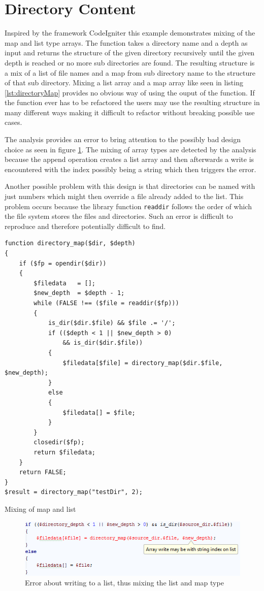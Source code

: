 \section{Directory Content}
\label{sec:directoryContent}
Inspired by the framework CodeIgniter this example demonstrates mixing of the map and list type arrays. The function takes a directory name and a depth as input and returns the structure of the given directory recursively until the given depth is reached or no more sub directories are found. The resulting structure is a mix of a list of file names and a map from sub directory name to the structure of that sub directory. Mixing a list array and a map array like seen in listing \ref{lst:directoryMap} provides no obvious way of using the ouput of the function. If the function ever has to be refactored the users may use the resulting structure in many different ways making it difficult to refactor without breaking possible use cases.

The analysis provides an error to bring attention to the possibly bad design choice as seen in figure \ref{fig:directoryScreenshot}. The mixing of array types are detected by the analysis because the append operation creates a list array and then afterwards a write is encountered with the index possibly being a string which then triggers the error.

Another possible problem with this design is that directories can be named with just numbers which might then override a file already added to the list. This problem occurs because the library function \texttt{readdir} follows the order of which the file system stores the files and directories. Such an error is difficult to reproduce and therefore potentially difficult to find.

\begin{program}
\begin{lstlisting}
function directory_map($dir, $depth)
{
    if ($fp = opendir($dir))
    {
        $filedata	= [];
        $new_depth	= $depth - 1;
        while (FALSE !== ($file = readdir($fp)))
        {
            is_dir($dir.$file) && $file .= '/';
            if (($depth < 1 || $new_depth > 0) 
                && is_dir($dir.$file))
            {
                $filedata[$file] = directory_map($dir.$file, $new_depth);
            }
            else
            {
                $filedata[] = $file;
            }
        }
        closedir($fp);
        return $filedata;
    }
    return FALSE;
}
$result = directory_map("testDir", 2);
\end{lstlisting}
\caption{Mixing of map and list}
\label{lst:directoryMap}
\end{program}

\begin{figure}[htbp]
\centering
\includegraphics[scale=0.6]{chapters/caseStudy/directoryError}
\caption{Error about writing to a list, thus mixing the list and map type}
\label{fig:directoryScreenshot}
\end{figure}